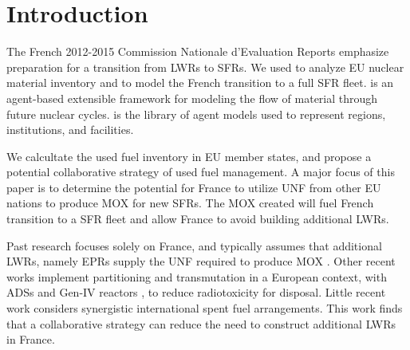 
\section{Introduction}
The French 2012-2015 Commission Nationale d'Evaluation Reports
\cite{cne2_reports_2015} emphasize preparation for a transition from \glspl{LWR} to \glspl{SFR}.
We used \Cyclus \cite{huff_fundamental_2016} to analyze
 \gls{EU} nuclear material inventory and to model the French transition to a 
 full \gls{SFR} fleet. \Cyclus is an agent-based extensible
framework for modeling the flow of material through future nuclear cycles. 
\Cycamore is the library of agent models used to represent regions, 
institutions, and facilities.

We calcultate the used fuel
inventory in \gls{EU} member states, and propose a potential collaborative
strategy of used fuel management.
A major focus of this paper is to determine the potential for France to utilize
\gls{UNF} from other \gls{EU} nations to produce \gls{MOX} for new \glspl{SFR}.
The \gls{MOX} created will fuel French transition to a \gls{SFR} fleet
and allow France to avoid building additional \glspl{LWR}.

Past research focuses solely on France, and typically assumes that additional \glspl{LWR},
namely \glspl{EPR} supply the \gls{UNF} required to produce \gls{MOX} \cite{carre_overview_2009, martin_symbiotic_2017, freynet_multiobjective_2016}.
Other recent works implement partitioning and transmutation
in a European context, with \glspl{ADS} and Gen-IV reactors \cite{fazio_study_2013},
to reduce radiotoxicity for disposal.
Little recent work considers synergistic international spent fuel arrangements.
This work finds that a collaborative strategy can reduce the
need to construct additional \glspl{LWR} in France.
